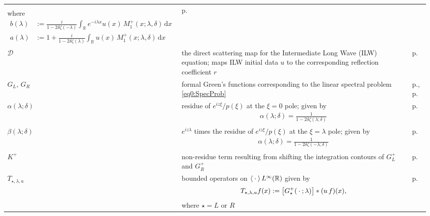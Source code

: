 \documentclass[../dissertation.tex]{subfiles}
\begin{document}
\begin{centering}
\begin{longtable}{R{.115\textwidth}|L{.74\textwidth}|C{.145\textwidth}}
{\begin{align*}
			\end{align*}
			where
			\begin{align*}
				b(\lambda)
				&:= 
					\frac{i}{1-2\delta\zeta(-\lambda)} 
					\int_{\mathbb R} e^{-i\lambda x} 
						u(x) \, M_1^+(x; \lambda,\delta) 
					\, \mathrm{d}x
					\\
			a(\lambda)
				&:=
					1 
					+ \frac{i}{1-2\delta \zeta(\lambda)}
						\int_{\mathbb R} 
							u(x) \, M_1^+(x; \lambda,\delta) 
						\, \mathrm{d}x
			\end{align*}
		} 
		& p.\pageref{sym0:reflection} \\
	$\mathscr D$ & the direct scattering map for the Intermediate Long Wave (ILW) equation; maps
		ILW initial data $u$ to the corresponding reflection coefficient $r$
		& p.\pageref{sym0:DSM} \\
	$G_L$, $G_R$ & formal Green's functions corresponding to the linear spectral problem 
		\eqref{eq0:SpecProb}
		& p.\pageref{eq0:GFL},  p.\pageref{eq0:GFR}\\
	$\alpha(\lambda; \delta)$ & residue of $e^{iz\xi}/p(\xi)$ at the $\xi=0$
		pole; given by 
		{\begin{align*}
			\alpha(\lambda; \delta)
				= \frac{1}{1-2\delta\zeta(\lambda; \delta)}
		\end{align*}}
		& p.\pageref{sym0:residues} \\
	$\beta(\lambda; \delta)$ & $e^{iz\lambda}$ times the residue of 
		$e^{iz\xi}/p(\xi)$ at the $\xi=\lambda$ pole; given by 
		{\begin{align*}
			\alpha(\lambda; \delta)
				= \frac{1}{1-2\delta\zeta(-\lambda; \delta)}
		\end{align*}}
		& p.\pageref{sym0:residues} \\
	$K^+$ & non-residue term resulting from shifting the integration contours of 
		$G_L^+$ and $G_R^+$
		& p.\pageref{sym0:K} \\
	$T_{\star, \lambda, u}$ & bounded operators on 
		$\left\langle \kern 0.5ex \cdot \kern 0.5ex \right\rangle L^\infty(\mathbb R)$ given by
		{
		\begin{align*}
			T_{\star, \lambda, u} f(x) 
				:= \big[ G_\star^+(\kern 0.5ex \cdot \kern 0.5ex; \lambda) \big] * (u\,f)(x),
		\end{align*}
		where $\star = L$ or $R$
		}
		& p.\pageref{eq0:Tstar} \\
	\end{longtable}
\end{centering}


\newpage

\end{document}
